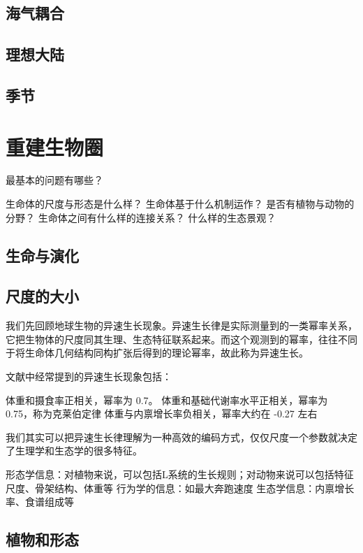 \documentclass[a4paper,10.5pt]{book}
\begin{document}
\section{海气耦合}

\section{理想大陆}

\section{季节}



\chapter{重建生物圈}

最基本的问题有哪些？

生命体的尺度与形态是什么样？
生命体基于什么机制运作？
是否有植物与动物的分野？
生命体之间有什么样的连接关系？
什么样的生态景观？

\section{生命与演化}

\section{尺度的大小}

我们先回顾地球生物的异速生长现象。异速生长律是实际测量到的一类幂率关系，
它把生物体的尺度同其生理、生态特征联系起来。而这个观测到的幂率，往往不同于将生命体几何结构同构扩张后得到的理论幂率，故此称为异速生长。

文献中经常提到的异速生长现象包括：

体重和摄食率正相关，幂率为 0.7。
体重和基础代谢率水平正相关，幂率为 0.75，称为克莱伯定律
体重与内禀增长率负相关，幂率大约在 -0.27 左右

我们其实可以把异速生长律理解为一种高效的编码方式，仅仅尺度一个参数就决定了生理学和生态学的很多特征。

形态学信息：对植物来说，可以包括L系统的生长规则；对动物来说可以包括特征尺度、骨架结构、体重等
行为学的信息：如最大奔跑速度
生态学信息：内禀增长率、食谱组成等

\section{植物和形态}
\end{document}
